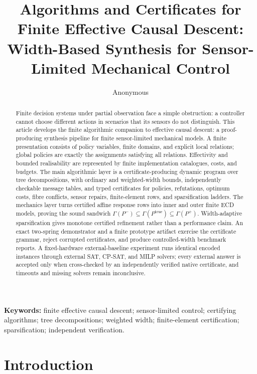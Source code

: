 \documentclass[11pt]{article}
\title{Algorithms and Certificates for Finite Effective Causal Descent:\\
Width-Based Synthesis for Sensor-Limited Mechanical Control}
\author{Anonymous}
\date{}
\theoremstyle{plain}
\theoremstyle{definition}
\theoremstyle{remark}
\begin{document}
\maketitle

\begin{abstract}
Finite decision systems under partial observation face a simple obstruction: a
controller cannot choose different actions in scenarios that its sensors do not
distinguish.  This article develops the finite algorithmic companion to
effective causal descent: a proof-producing synthesis pipeline for finite
sensor-limited mechanical models.  A finite presentation consists of policy variables, finite domains, and
explicit local relations; global policies are exactly the assignments satisfying
all relations.  Effectivity and bounded realisability are represented by finite
implementation catalogues, costs, and budgets.  The main algorithmic layer is a
certificate-producing dynamic program over tree decompositions, with ordinary
and weighted-width bounds, independently checkable message tables, and typed
certificates for policies, refutations, optimum costs, fibre conflicts, sensor
repairs, finite-element rows, and sparsification ladders.  The mechanics layer
turns certified affine response rows into inner and outer finite ECD models,
proving the sound sandwich
\(\Gamma(P^-)\subseteq\Gamma(P^{\mathrm{true}})\subseteq\Gamma(P^+)\).
Width-adaptive sparsification gives monotone certified refinement rather than a
performance claim.  An exact two-spring demonstrator and a finite prototype
artifact exercise the certificate grammar, reject corrupted certificates, and
produce controlled-width benchmark reports.  A fixed-hardware external-baseline
experiment runs identical encoded instances through external SAT, CP-SAT, and
MILP solvers; every external answer is accepted only when cross-checked by an
independently verified native certificate, and timeouts and missing solvers
remain inconclusive.
\end{abstract}

\noindent\textbf{Keywords:} finite effective causal descent; sensor-limited control;
certifying algorithms; tree decompositions; weighted width; finite-element
certification; sparsification; independent verification.

\tableofcontents

\section{Introduction}
\label{sec:introduction}
\end{document}
